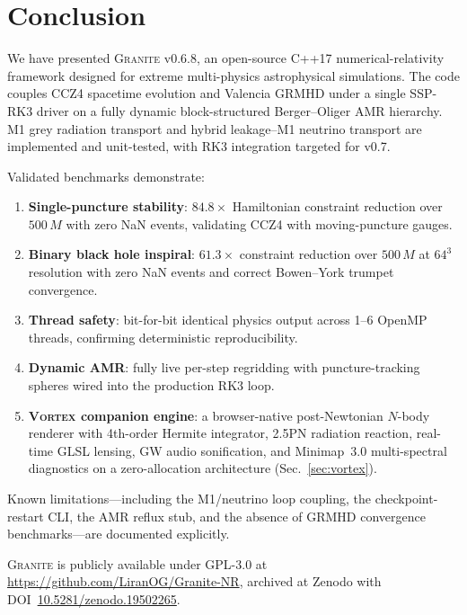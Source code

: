 \documentclass[aps,prd,twocolumn,superscriptaddress,nofootinbib,showpacs,
               longbibliography]{revtex4-2}
\newcommand{\granite}{\textsc{Granite}}
\begin{document}
\section{Conclusion}
\label{sec:conclusion}

We have presented \granite{} v0.6.8, an open-source C++17 numerical-relativity
framework designed for extreme multi-physics astrophysical simulations.
The code couples CCZ4 spacetime evolution and Valencia GRMHD under a single
SSP-RK3 driver on a fully dynamic block-structured Berger--Oliger AMR
hierarchy.
M1 grey radiation transport and hybrid leakage--M1 neutrino transport are
implemented and unit-tested, with RK3 integration targeted for v0.7.

Validated benchmarks demonstrate:
\begin{enumerate}[nosep]
  \item \textbf{Single-puncture stability}: $84.8\times$ Hamiltonian
    constraint reduction over $500\,M$ with zero NaN events, validating CCZ4
    with moving-puncture gauges.
  \item \textbf{Binary black hole inspiral}: $61.3\times$ constraint reduction
    over $500\,M$ at $64^3$ resolution with zero NaN events and correct
    Bowen--York trumpet convergence.
  \item \textbf{Thread safety}: bit-for-bit identical physics output across
    1--6 OpenMP threads, confirming deterministic reproducibility.
  \item \textbf{Dynamic AMR}: fully live per-step regridding with
    puncture-tracking spheres wired into the production RK3 loop.
  \item \textbf{\textsc{Vortex} companion engine}: a browser-native
    post-Newtonian $N$-body renderer with 4th-order Hermite integrator,
    2.5PN radiation reaction, real-time GLSL lensing, GW audio sonification,
    and Minimap~3.0 multi-spectral diagnostics on a zero-allocation
    architecture (Sec.~\ref{sec:vortex}).
\end{enumerate}

Known limitations---including the M1/neutrino loop coupling, the
checkpoint-restart CLI, the AMR reflux stub, and the absence of
GRMHD convergence benchmarks---are documented explicitly.

\granite{} is publicly available under GPL-3.0 at
\url{https://github.com/LiranOG/Granite-NR}, archived at Zenodo with
DOI~\href{https://doi.org/10.5281/zenodo.19502265}{10.5281/zenodo.19502265}.
\end{document}
